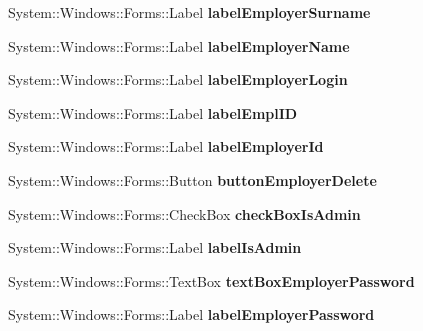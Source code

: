 \begin{DoxyCompactItemize}
System\+::\+Windows\+::\+Forms\+::\+Label {\bfseries label\+Employer\+Surname}
\item 
\hypertarget{class_magazyn_1_1_magazin_aa3f017f090715c1df84637c61312c6bb}{}\label{class_magazyn_1_1_magazin_aa3f017f090715c1df84637c61312c6bb} 
System\+::\+Windows\+::\+Forms\+::\+Label {\bfseries label\+Employer\+Name}
\item 
\hypertarget{class_magazyn_1_1_magazin_a704bc02c3be8fa4dd08664ca6926083f}{}\label{class_magazyn_1_1_magazin_a704bc02c3be8fa4dd08664ca6926083f} 
System\+::\+Windows\+::\+Forms\+::\+Label {\bfseries label\+Employer\+Login}
\item 
\hypertarget{class_magazyn_1_1_magazin_aec18eccf8998a0c792845c1326102c62}{}\label{class_magazyn_1_1_magazin_aec18eccf8998a0c792845c1326102c62} 
System\+::\+Windows\+::\+Forms\+::\+Label {\bfseries label\+Empl\+ID}
\item 
\hypertarget{class_magazyn_1_1_magazin_a2f3fe6e9fcecf194eef94cf6b34cd555}{}\label{class_magazyn_1_1_magazin_a2f3fe6e9fcecf194eef94cf6b34cd555} 
System\+::\+Windows\+::\+Forms\+::\+Label {\bfseries label\+Employer\+Id}
\item 
\hypertarget{class_magazyn_1_1_magazin_a2d0136e34df89fc8dee55fe0af63e32c}{}\label{class_magazyn_1_1_magazin_a2d0136e34df89fc8dee55fe0af63e32c} 
System\+::\+Windows\+::\+Forms\+::\+Button {\bfseries button\+Employer\+Delete}
\item 
\hypertarget{class_magazyn_1_1_magazin_ad8195d837594914777430213d2045b57}{}\label{class_magazyn_1_1_magazin_ad8195d837594914777430213d2045b57} 
System\+::\+Windows\+::\+Forms\+::\+Check\+Box {\bfseries check\+Box\+Is\+Admin}
\item 
\hypertarget{class_magazyn_1_1_magazin_aaf748fe14abed6e099836cc76daa51f6}{}\label{class_magazyn_1_1_magazin_aaf748fe14abed6e099836cc76daa51f6} 
System\+::\+Windows\+::\+Forms\+::\+Label {\bfseries label\+Is\+Admin}
\item 
\hypertarget{class_magazyn_1_1_magazin_aa6db3c0fc2d11cc72fcad119e3237f87}{}\label{class_magazyn_1_1_magazin_aa6db3c0fc2d11cc72fcad119e3237f87} 
System\+::\+Windows\+::\+Forms\+::\+Text\+Box {\bfseries text\+Box\+Employer\+Password}
\item 
\hypertarget{class_magazyn_1_1_magazin_aace8d79df5d5c67e327cf86039dd34fb}{}\label{class_magazyn_1_1_magazin_aace8d79df5d5c67e327cf86039dd34fb} 
System\+::\+Windows\+::\+Forms\+::\+Label {\bfseries label\+Employer\+Password}
\item 
\hypertarget{class_magazyn_1_1_magazin_ac32ce80fc6c3e67d3d10b3e024c88fca}{}\label{class_magazyn_1_1_magazin_ac32ce80fc6c3e67d3d10b3e024c88fca} 

\end{DoxyCompactItemize}
